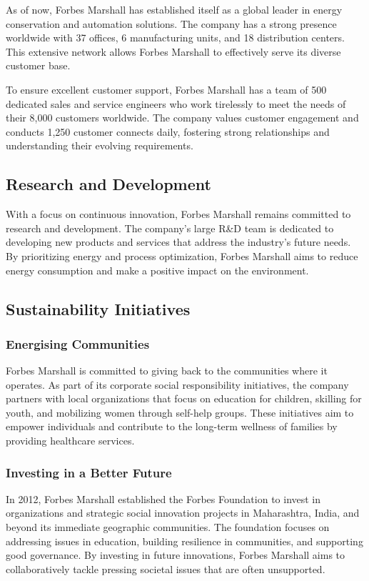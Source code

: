 As of now, Forbes Marshall has established itself as a global leader in energy conservation and automation solutions. The company has a strong presence worldwide with 37 offices, 6 manufacturing units, and 18 distribution centers. This extensive network allows Forbes Marshall to effectively serve its diverse customer base.

To ensure excellent customer support, Forbes Marshall has a team of 500 dedicated sales and service engineers who work tirelessly to meet the needs of their 8,000 customers worldwide. The company values customer engagement and conducts 1,250 customer connects daily, fostering strong relationships and understanding their evolving requirements.

\subsection{Research and Development}
With a focus on continuous innovation, Forbes Marshall remains committed to research and development. The company's large R\&D team is dedicated to developing new products and services that address the industry's future needs. By prioritizing energy and process optimization, Forbes Marshall aims to reduce energy consumption and make a positive impact on the environment.

\subsection{Sustainability Initiatives}
\subsubsection{Energising Communities}
Forbes Marshall is committed to giving back to the communities where it operates. As part of its corporate social responsibility initiatives, the company partners with local organizations that focus on education for children, skilling for youth, and mobilizing women through self-help groups. These initiatives aim to empower individuals and contribute to the long-term wellness of families by providing healthcare services.

\subsubsection{Investing in a Better Future}
In 2012, Forbes Marshall established the Forbes Foundation to invest in organizations and strategic social innovation projects in Maharashtra, India, and beyond its immediate geographic communities. The foundation focuses on addressing issues in education, building resilience in communities, and supporting good governance. By investing in future innovations, Forbes Marshall aims to collaboratively tackle pressing societal issues that are often unsupported.


